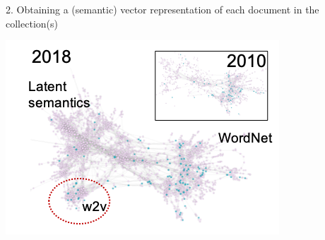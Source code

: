 \documentclass{beamer}
\begin{document}
\begin{frame}
\begin{itemize}
\begin{columns}
\begin{column}{0.48\textwidth}
\begin{exampleblock}{2. Obtaining a (semantic) vector representation of each document in the collection(s)}
           \centerline{\includegraphics[width=\textwidth]{./figs/graph.png}}
        \end{exampleblock}
        \end{column}
        \end{columns}

    \end{itemize}

\end{frame}
\end{document}
